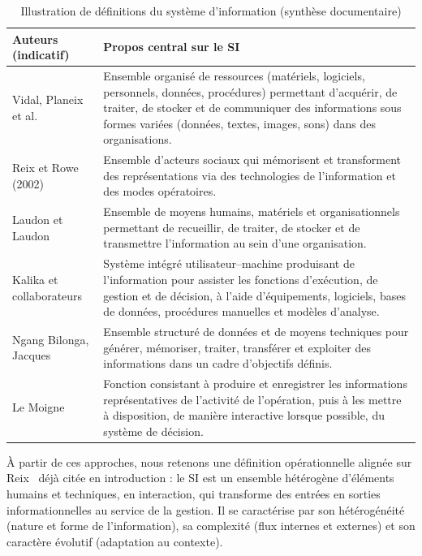 \begin{table}[H]
\centering
\footnotesize
\begin{tabularx}{\textwidth}{@{}lX@{}}
\toprule
\textbf{Auteurs (indicatif)} & \textbf{Propos central sur le SI} \\
\midrule
Vidal, Planeix et al. &
Ensemble organisé de ressources (matériels, logiciels, personnels, données, procédures)
permettant d'acquérir, de traiter, de stocker et de communiquer des informations sous
formes variées (données, textes, images, sons) dans des organisations. \\
\midrule
Reix et Rowe (2002) &
Ensemble d'acteurs sociaux qui mémorisent et transforment des représentations via des
technologies de l'information et des modes opératoires. \\
\midrule
Laudon et Laudon &
Ensemble de moyens humains, matériels et organisationnels permettant de recueillir, de
traiter, de stocker et de transmettre l'information au sein d'une organisation. \\
\midrule
Kalika et collaborateurs &
Système intégré utilisateur--machine produisant de l'information pour assister les
fonctions d'exécution, de gestion et de décision, à l'aide d'équipements, logiciels, bases
de données, procédures manuelles et modèles d'analyse. \\
\midrule
Ngang Bilonga, Jacques &
Ensemble structuré de données et de moyens techniques pour générer, mémoriser, traiter,
transférer et exploiter des informations dans un cadre d'objectifs définis. \\
\midrule
Le Moigne &
Fonction consistant à produire et enregistrer les informations représentatives de
l'activité de l'opération, puis à les mettre à disposition, de manière interactive lorsque
possible, du système de décision. \\
\bottomrule
\end{tabularx}
\caption{Illustration de définitions du système d'information (synthèse documentaire)}
\label{tab:defsi}
\end{table}

À partir de ces approches, nous retenons une définition opérationnelle alignée sur Reix~\cite{reix1995}
déjà citée en introduction : le SI est un ensemble hétérogène d'éléments humains et techniques,
en interaction, qui transforme des entrées en sorties informationnelles au service de la gestion.
Il se caractérise par son hétérogénéité (nature et forme de l'information), sa complexité (flux
internes et externes) et son caractère évolutif (adaptation au contexte).

